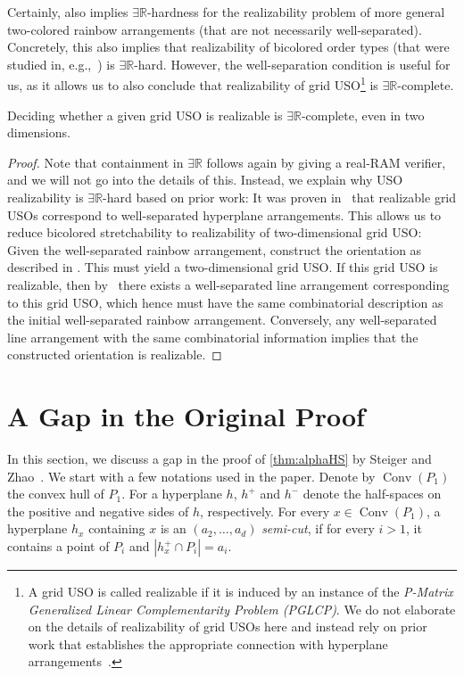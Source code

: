 \documentclass[a4paper,UKenglish,cleveref, autoref, thm-restate, nolineno]{socg-lipics-v2021}
\newcommand{\ER}{\exists\mathbb{R}}
\DeclareMathOperator{\conv}{Conv}
\begin{document}
Certainly,  also implies $\ER$-hardness for the realizability problem of more general two-colored rainbow arrangements (that are not necessarily well-separated). Concretely, this also implies that realizability of bicolored order types (that were studied in, e.g.,~\cite{aichholzerBicoloredOrderTypes2024}) is $\ER$-hard. However, the well-separation condition is useful for us, as it allows us to also conclude that realizability of grid USO\footnote{A grid USO is called realizable if it is induced by an instance of the \emph{P-Matrix Generalized Linear Complementarity Problem (PGLCP)}. We do not elaborate on the details of realizability of grid USOs here and instead rely on prior work that establishes the appropriate connection with hyperplane arrangements~\cite{borzechowskiTwoChoicesAre2024}.} is $\ER$-complete.

\begin{corollary}
\label{corollary:grid_uso_hard}
    Deciding whether a given grid USO is realizable is $\ER$-complete, even in two dimensions.
\end{corollary}
\begin{proof}
    Note that containment in $\ER$ follows again by giving a real-RAM verifier, and we will not go into the details of this. Instead, we explain why USO realizability is $\ER$-hard based on prior work: It was proven in~\cite{borzechowskiTwoChoicesAre2024} that realizable grid USOs correspond to well-separated hyperplane arrangements. This allows us to reduce bicolored stretchability to realizability of two-dimensional grid USO: Given the well-separated rainbow arrangement, construct the orientation as described in . This must yield a two-dimensional grid USO. If this grid USO is realizable, then by~\cite{borzechowskiTwoChoicesAre2024} there exists a well-separated line arrangement corresponding to this grid USO, which hence must have the same combinatorial description as the initial well-separated rainbow arrangement. Conversely, any well-separated line arrangement with the same combinatorial information implies that the constructed orientation is realizable. 
\end{proof}





\appendix

\section{A Gap in the Original Proof}
\label{app:gap}
In this section, we discuss a gap in the proof of \cref{thm:alphaHS} by Steiger and Zhao~\cite{steigerGeneralizedHamSandwichCuts2010}.
We start with a few notations used in the paper.
Denote by $\conv(P_1)$ the convex hull of $P_1$.
For a hyperplane $h$, $h^+$ and $h^-$ denote the half-spaces on the positive and negative sides of $h$, respectively.
For every $x \in \conv(P_1)$, 
a hyperplane $h_x$ containing $x$ is an $(a_2, \dots, a_d)$ \emph{semi-cut}, if for every $i > 1$, it contains a point of $P_i$ and $|h^+_x \cap P_i| = a_i$.
\end{document}
